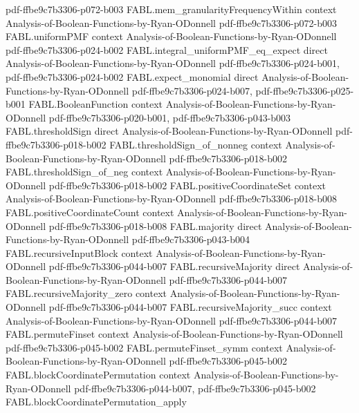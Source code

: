 \begin{theorem}
  {pdf-ffbe9c7b3306-p072-b003}
\proofstep
  {FABL.mem_granularityFrequencyWithin}
  {context}
  {Analysis-of-Boolean-Functions-by-Ryan-ODonnell}
  {pdf-ffbe9c7b3306-p072-b003}
\proofstep
  {FABL.uniformPMF}
  {context}
  {Analysis-of-Boolean-Functions-by-Ryan-ODonnell}
  {pdf-ffbe9c7b3306-p024-b002}
\proofstep
  {FABL.integral_uniformPMF_eq_expect}
  {direct}
  {Analysis-of-Boolean-Functions-by-Ryan-ODonnell}
  {pdf-ffbe9c7b3306-p024-b001,
    pdf-ffbe9c7b3306-p024-b002}
\proofstep
  {FABL.expect_monomial}
  {direct}
  {Analysis-of-Boolean-Functions-by-Ryan-ODonnell}
  {pdf-ffbe9c7b3306-p024-b007,
    pdf-ffbe9c7b3306-p025-b001}
\proofstep
  {FABL.BooleanFunction}
  {context}
  {Analysis-of-Boolean-Functions-by-Ryan-ODonnell}
  {pdf-ffbe9c7b3306-p020-b001,
    pdf-ffbe9c7b3306-p043-b003}
\proofstep
  {FABL.thresholdSign}
  {direct}
  {Analysis-of-Boolean-Functions-by-Ryan-ODonnell}
  {pdf-ffbe9c7b3306-p018-b002}
\proofstep
  {FABL.thresholdSign_of_nonneg}
  {context}
  {Analysis-of-Boolean-Functions-by-Ryan-ODonnell}
  {pdf-ffbe9c7b3306-p018-b002}
\proofstep
  {FABL.thresholdSign_of_neg}
  {context}
  {Analysis-of-Boolean-Functions-by-Ryan-ODonnell}
  {pdf-ffbe9c7b3306-p018-b002}
\proofstep
  {FABL.positiveCoordinateSet}
  {context}
  {Analysis-of-Boolean-Functions-by-Ryan-ODonnell}
  {pdf-ffbe9c7b3306-p018-b008}
\proofstep
  {FABL.positiveCoordinateCount}
  {context}
  {Analysis-of-Boolean-Functions-by-Ryan-ODonnell}
  {pdf-ffbe9c7b3306-p018-b008}
\proofstep
  {FABL.majority}
  {direct}
  {Analysis-of-Boolean-Functions-by-Ryan-ODonnell}
  {pdf-ffbe9c7b3306-p043-b004}
\proofstep
  {FABL.recursiveInputBlock}
  {context}
  {Analysis-of-Boolean-Functions-by-Ryan-ODonnell}
  {pdf-ffbe9c7b3306-p044-b007}
\proofstep
  {FABL.recursiveMajority}
  {direct}
  {Analysis-of-Boolean-Functions-by-Ryan-ODonnell}
  {pdf-ffbe9c7b3306-p044-b007}
\proofstep
  {FABL.recursiveMajority_zero}
  {context}
  {Analysis-of-Boolean-Functions-by-Ryan-ODonnell}
  {pdf-ffbe9c7b3306-p044-b007}
\proofstep
  {FABL.recursiveMajority_succ}
  {context}
  {Analysis-of-Boolean-Functions-by-Ryan-ODonnell}
  {pdf-ffbe9c7b3306-p044-b007}
\proofstep
  {FABL.permuteFinset}
  {context}
  {Analysis-of-Boolean-Functions-by-Ryan-ODonnell}
  {pdf-ffbe9c7b3306-p045-b002}
\proofstep
  {FABL.permuteFinset_symm}
  {context}
  {Analysis-of-Boolean-Functions-by-Ryan-ODonnell}
  {pdf-ffbe9c7b3306-p045-b002}
\proofstep
  {FABL.blockCoordinatePermutation}
  {context}
  {Analysis-of-Boolean-Functions-by-Ryan-ODonnell}
  {pdf-ffbe9c7b3306-p044-b007,
    pdf-ffbe9c7b3306-p045-b002}
\proofstep
  {FABL.blockCoordinatePermutation_apply}

\end{theorem}
